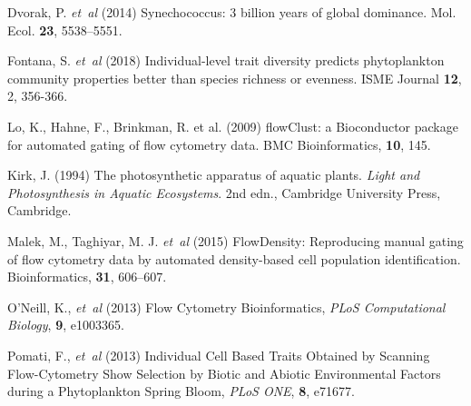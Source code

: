 \documentclass[a4paper,12pt]{extarticle}
\begin{document}
%
%
%
%
%
%
%
%
%


\begin{thebibliography}{}
	
	Dvorak, P. \textit{et~al} (2014) Synechococcus: 3 billion years of global dominance. Mol. Ecol. {\bf 23}, 5538–5551.

Fontana, S. \textit{et~al} (2018) Individual-level trait diversity predicts phytoplankton community properties better than species richness or evenness. ISME Journal {\bf 12}, 2, 356-366.

Lo, K., Hahne, F., Brinkman, R. et al. (2009) flowClust: a Bioconductor package for automated gating of flow cytometry data. BMC Bioinformatics, {\bf10}, 145.

Kirk, J. (1994) The photosynthetic apparatus of aquatic plants. \textit{Light and Photosynthesis in Aquatic Ecosystems}. 2nd edn., Cambridge University Press, Cambridge.

Malek, M., Taghiyar, M. J. \textit{et~al} (2015) FlowDensity: Reproducing manual gating of flow cytometry data by automated density-based cell population identification. Bioinformatics, {\bf 31}, 606--607.

O'Neill, K., \textit{et~al} (2013) Flow Cytometry Bioinformatics, {\it PLoS Computational Biology}, {\bf 9}, e1003365.

Pomati, F., \textit{et~al} (2013) Individual Cell Based Traits Obtained by Scanning Flow-Cytometry Show Selection by Biotic and Abiotic Environmental Factors during a Phytoplankton Spring Bloom, {\it PLoS ONE}, {\bf 8}, e71677. 


\end{thebibliography}
\end{document}
